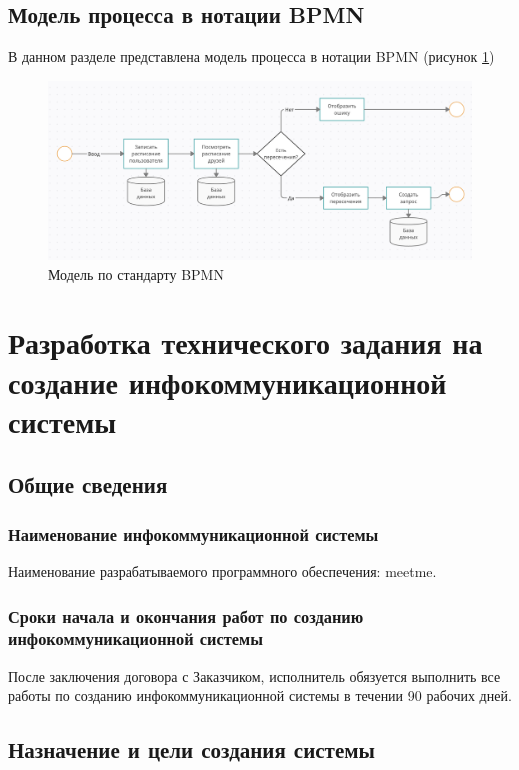 \documentclass[14pt]{extreport}
\begin{document}
\section{Модель процесса в нотации BPMN}
В данном разделе представлена модель процесса в нотации BPMN (рисунок \ref{fig:bpmn})
\begin{figure}[h]   
    \centering
    \includegraphics[width=0.9\linewidth]{img/BPMN.png}
    \caption{ Модель по стандарту BPMN}
    \label{fig:bpmn}
\end{figure}




\chapter{Разработка технического задания на создание инфокоммуникационной системы} 

\section{Общие сведения}
    \subsection{Наименование инфокоммуникационной системы}
        Наименование разрабатываемого программного обеспечения: meet\textunderscore me. 
    \subsection{Сроки начала и окончания работ по созданию инфокоммуникационной системы}
        После заключения договора с Заказчиком, исполнитель обязуется выполнить все работы по созданию инфокоммуникационной системы в течении 90 рабочих дней.

\section{Назначение и цели создания системы}
\end{document}
